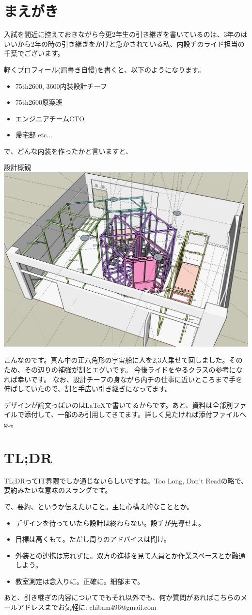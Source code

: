 \documentclass[uplatex,dvipdfmx]{jsarticle}
\begin{document}
\maketitle

\section{まえがき}

入試を間近に控えておきながら今更2年生の引き継ぎを書いているのは、3年のはいいから2年の時の引き継ぎをかけと急かされている私、内設チのライド担当の千葉でございます。

軽くプロフィール(肩書き自慢)を書くと、以下のようになります。
\begin{itemize}
    \item 75th2600, 3600内装設計チーフ
    \item 75th2600原案班
    \item エンジニアチームCTO
    \item 帰宅部 etc...
\end{itemize}

で、どんな内装を作ったかと言いますと、

\begin{imageHere}{設計概観}
    \includegraphics[width=0.5\linewidth]{images/plan_overview/1.png}
\end{imageHere}

こんなのです。真ん中の正六角形の宇宙船に人を2,3人乗せて回しました。そのため、その辺りの補強が割とエグいです。
今後ライドをやるクラスの参考になれば幸いです。
なお、設計チーフの身ながら内チの仕事に近いところまで手を伸ばしていたので、割と手広い引き継ぎになってます。

デザインが論文っぽいのは\LaTeX{}で書いてるからです。あと、資料は全部別ファイルで添付して、一部のみ引用してきてます。詳しく見たければ添付ファイルへgo。

\clearpage

\tableofcontents

\section{TL;DR}
TL;DRってIT界隈でしか通じないらしいですね。Too Long, Don't Readの略で、要約みたいな意味のスラングです。

で、要約、というか伝えたいこと。主に心構え的なこととか。

\begin{itemize}
    \item デザインを待っていたら設計は終わらない。設チが先導せよ。
    \item 目標は高くもて。ただし周りのアドバイスは聞け。
    \item 外装との連携は忘れずに。双方の進捗を見て人員とか作業スペースとか融通しよう。
    \item 教室測定は念入りに。正確に。細部まで。
\end{itemize}

あと、引き継ぎの内容についてでもそれ以外でも、何か質問があればこちらのメールアドレスまでお気軽に:  chibam496@gmail.com
\end{document}
